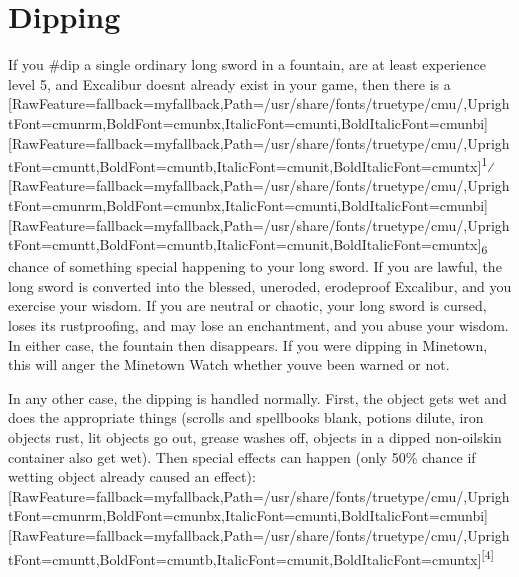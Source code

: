 


\section{Dipping}
\label{5}
If you \#dip\footnotemark[62] a single ordinary long sword in a fountain, are at least experience level 5, and Excalibur\footnotemark[63] doesn\textquotesingle{}t already exist in your game, then there is a \allowbreak{}\setmainfont{cmunrm.ttf}[RawFeature={fallback=myfallback},Path=/usr/share/fonts/truetype/cmu/,UprightFont=cmunrm,BoldFont=cmunbx,ItalicFont=cmunti,BoldItalicFont=cmunbi]\setmonofont{cmunrm.ttf}[RawFeature={fallback=myfallback},Path=/usr/share/fonts/truetype/cmu/,UprightFont=cmuntt,BoldFont=cmuntb,ItalicFont=cmunit,BoldItalicFont=cmuntx]\textsuperscript{1}⁄\allowbreak{}\setmainfont{cmunrm.ttf}[RawFeature={fallback=myfallback},Path=/usr/share/fonts/truetype/cmu/,UprightFont=cmunrm,BoldFont=cmunbx,ItalicFont=cmunti,BoldItalicFont=cmunbi]\setmonofont{cmunrm.ttf}[RawFeature={fallback=myfallback},Path=/usr/share/fonts/truetype/cmu/,UprightFont=cmuntt,BoldFont=cmuntb,ItalicFont=cmunit,BoldItalicFont=cmuntx]\textsubscript{6} chance of something special happening to your long sword. If you are lawful, the long sword is converted into the blessed, uneroded, erodeproof Excalibur, and you exercise your wisdom. If you are neutral or chaotic, your long sword is cursed, loses its rustproofing, and may lose an enchantment, and you abuse your wisdom. In either case, the fountain then disappears. If you were dipping in Minetown\footnotemark[64], this will anger the Minetown Watch whether you\textquotesingle{}ve been warned or not.


In any other case, the dipping is handled normally. First, the object gets wet and does the appropriate things (scrolls and spellbooks blank, potions dilute, iron objects rust, lit objects go out, grease washes off, objects in a dipped non-{}oilskin container also get wet). Then special effects can happen (only 50\% chance if wetting object already caused an effect):\allowbreak{}\setmainfont{cmunrm.ttf}[RawFeature={fallback=myfallback},Path=/usr/share/fonts/truetype/cmu/,UprightFont=cmunrm,BoldFont=cmunbx,ItalicFont=cmunti,BoldItalicFont=cmunbi]\setmonofont{cmunrm.ttf}[RawFeature={fallback=myfallback},Path=/usr/share/fonts/truetype/cmu/,UprightFont=cmuntt,BoldFont=cmuntb,ItalicFont=cmunit,BoldItalicFont=cmuntx]\textsuperscript{{$\text{[}$}4{$\text{]}$}}




